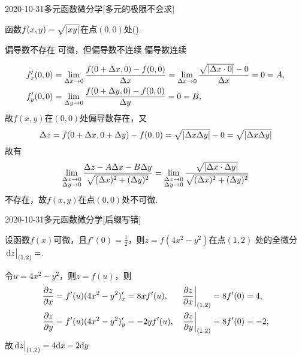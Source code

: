 \documentclass{ctexart}
\begin{document}
\begin{mathques}{2020-10-31}{多元函数微分学}[多元的极限不会求]
\begin{ques}
  函数$f(x, y) = \sqrt{\abs{xy}}$在点$(0, 0)$处(\quad).
  \begin{multichoice}
  \task 偏导数不存在
  \task {}
  \task 可微，但偏导数不连续
  \task 偏导数连续
  \end{multichoice}
\end{ques}
\begin{solu}
  \begin{align*}
    f'_x(0, 0) &= \lim_{\Delta x \to 0} \frac{f(0 + \Delta x, 0) - f(0, 0)}
    {\Delta x} = \lim_{\Delta x \to 0} \frac{\sqrt{\abs{\Delta x \cdot 0}} - 0}
    {\Delta x} = 0 = A,\\
    f'_y(0, 0) &= \lim_{\Delta y \to 0} \frac{f(0 + \Delta y, 0) - f(0, 0)}
    {\Delta y} = 0 = B,\\
  \end{align*}
  故$f(x, y)$在$(0, 0)$处偏导数存在，又
  \[
    \Delta z = f(0 + \Delta x, 0 + \Delta y) - f(0, 0) = \sqrt{\abs{\Delta
    x\Delta y}} - 0= \sqrt{\abs{\Delta x\Delta y}}
  \]
  故有
  \[
    \lim_{\substack{\Delta x \to 0\\\Delta y \to 0}} \frac{\Delta z
    - A\Delta x - B\Delta y}{\sqrt{(\Delta x)^2 + (\Delta y)^2}} =
    \lim_{\substack{\Delta x \to 0\\\Delta y \to 0}}
    \frac{\sqrt{\abs{\Delta x\cdot \Delta y}}}{\sqrt{(\Delta x)^2 + (\Delta y)^2}}
  \]
  不存在，故$f(x, y)$在点$(0, 0)$处不可微.
\end{solu}
\end{mathques}

\begin{mathques}{2020-10-31}{多元函数微分学}[后缀写错]
\begin{ques}
  设函数$f(x)$可微，且$f'(0) = \frac{1}{2}$，则$z = f(4x^2 - y^2)$在点$(1, 2)$
  处的全微分$\eval{\dd z}_{(1, 2)}=$\mathblank.
\end{ques}
\begin{solu}

  令$u = 4x^2 - y^2$，则$z = f(u)$，则
  \begin{align*}
    \pdv{z}{x} &= f'(u)(4x^2 - y^2)'_x = 8xf'(u), & \eval{\pdv{z}{x}}_{(1, 2)}
    &= 8f'(0) = 4,\\
    \pdv{z}{y} &= f'(u)(4x^2 - y^2)'_y = -2yf'(u), & \eval{\pdv{z}{y}}_{(1, 2)}
    &= 8f'(0) = -2,
  \end{align*}
  故$\eval{\dd z}_{(1, 2)} = 4\dd x-2\dd y$
\end{solu}
\end{mathques}
\end{document}
